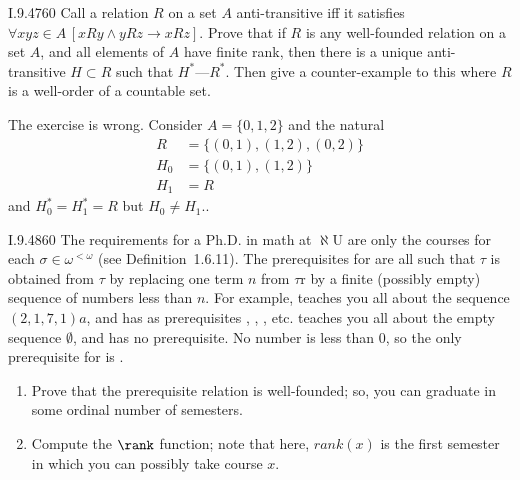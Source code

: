 \begin{lexcopy}{I.9.47}{60}
Call a relation $R$ on a set $A$ anti-transitive iff it satisfies
\(\forall x y z \in A\, [xRy \land yRz \to xRz]\).
Prove that if $R$ is any well-founded relation
on a set $A$, and all elements of $A$ have finite rank,
then there is a unique anti-transitive \(H \subset R\)
such that \(H^* — R^*\). Then give a counter-example to this
where $R$ is a well-order of a countable set.
\end{lexcopy}

The exercise is wrong.
Consider \(A = \{0, 1, 2\}\) and the natural
\begin{align*}
  R &= \{(0, 1), (1, 2), (0, 2)\} \\
  H_0 &= \{(0, 1), (1, 2)\} \\
  H_1 &= R
\end{align*}
and \(H_0^* = H_1^* = R\) but \(H_0 \neq H_1\)..

\begin{lexcopy}{I.9.48}{60}
The requirements for a Ph.D. in math at \(\aleph\)U are only the
courses \framebox{\(\sigma\)} for each
\(\sigma \in \omega^{<\omega}\) (see Definition~1.6.11). The prerequisites for
 are all \framebox{\(\tau\)} such that
\(\tau\) is obtained from \(\tau\) by replacing one term $n$ from
\(\tau\)r by a finite (possibly empty) sequence of numbers less than $n$.
For example,
 teaches you all about the sequence \((2,1, 7,1)a\),
and has as prerequisites
,
,
, etc.
\framebox{\ } teaches you all about the empty sequence \(\emptyset\),
and has no prerequisite. No number is less than $0$, so
the only prerequisite for  is \framebox{\ }.

\begin{enumerate}
\renewcommand{\theenumi}{\alph{enumi}}
\item
Prove that the prerequisite relation is well-founded; so, you can graduate
in some ordinal number of semesters.
\item
Compute the \(\rank\) function; note that here, \(rank(x)\) is the first semester
in which you can possibly take course $x$.
\end{enumerate}
\end{lexcopy}

